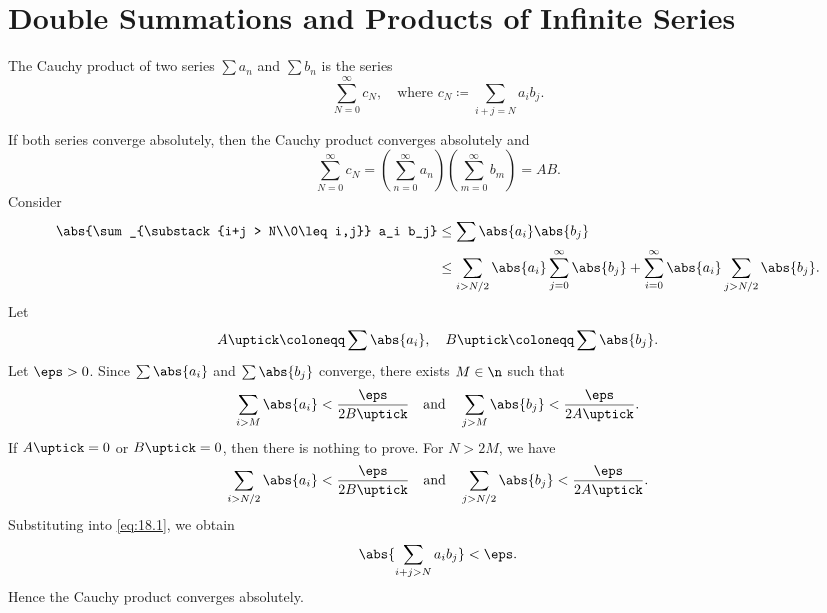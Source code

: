 
\section{Double Summations and Products of Infinite Series}


\begin{definition}
    The Cauchy product of two series $\sum a_n$ and $\sum b_n$ is the series
    \[
        \sum_{N=0}^\infty c_N, \quad \text{where } c_N \coloneqq \sum_{i+j = N} a_i b_j.
    \]
\end{definition}

\begin{theorem}{
    If both series converge absolutely, then the Cauchy product converges absolutely and
    \[
        \sum_{N=0}^\infty c_N = \left(\sum_{n=0}^\infty a_n\right)\left(\sum_{m=0}^\infty b_m\right) = AB.
    \]
}
    Consider
    \begin{align}
        \abs{\sum_{\substack{i+j > N\\0\leq i,j}} a_i b_j}
        &\leq \sum \abs{a_i}\abs{b_j}\nonumber\\
        &\leq \sum_{i > N/2} \abs{a_i}\sum_{j=0}^\infty \abs{b_j}
        + \sum_{i=0}^\infty \abs{a_i}\sum_{j > N/2} \abs{b_j}.\label{eq:18.1}
    \end{align}
    Let
    \[
        A\uptick \coloneqq \sum \abs{a_i}, \quad B\uptick \coloneqq \sum \abs{b_j}.
    \]
    Let $\eps > 0$.
    Since $\sum \abs{a_i}$ and $\sum \abs{b_j}$ converge, there exists $M\in\n$ such that
    \[
        \sum_{i > M} \abs{a_i} < \dfrac{\eps}{2B\uptick}
        \quad\text{and}\quad
        \sum_{j > M} \abs{b_j} < \dfrac{\eps}{2A\uptick}.
    \]
    If $A\uptick = 0$ or $B\uptick = 0$, then there is nothing to prove.
    For $N > 2M$, we have
    \[
        \sum_{i > N/2} \abs{a_i} < \dfrac{\eps}{2B\uptick}
        \quad\text{and}\quad
        \sum_{j > N/2} \abs{b_j} < \dfrac{\eps}{2A\uptick}.
    \]
    Substituting into \eqref{eq:18.1}, we obtain
    \[
        \abs{\sum_{\substack{i+j > N}} a_i b_j} < \eps.
    \]
    Hence the Cauchy product converges absolutely.
\end{theorem}